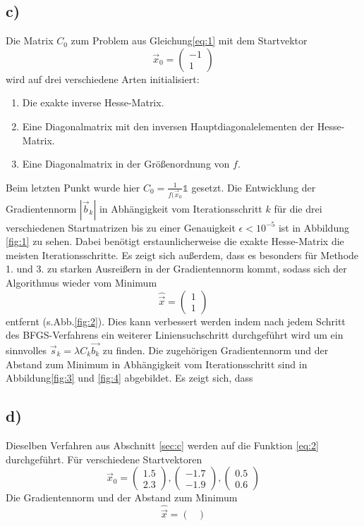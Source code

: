 \subsection*{c)}
\label{sec:c}
Die Matrix $C_0$ zum Problem aus Gleichung\eqref{eq:1} mit dem Startvektor
\[
\vec{x}_0 = \begin{pmatrix}
-1\\
1
\end{pmatrix}
\]
wird auf drei verschiedene Arten initialisiert:
\begin{enumerate}
\item Die exakte inverse Hesse-Matrix.
\item Eine Diagonalmatrix mit den inversen Hauptdiagonalelementen der Hesse-Matrix.
\item Eine Diagonalmatrix in der Größenordnung von $f$.
\end{enumerate}
Beim letzten Punkt wurde hier $C_0 = \frac{1}{f(\vec{x}_0}\mathds{1}$ gesetzt.
Die Entwicklung der Gradientennorm $|\vec{b}_k|$ in Abhängigkeit vom Iterationsschritt $k$ für die drei verschiedenen Startmatrizen bis zu einer Genauigkeit $\epsilon < 10^{-5}$ ist in Abbildung \ref{fig:1} zu sehen. Dabei benötigt erstaunlicherweise die exakte Hesse-Matrix die meisten Iterationsschritte. Es zeigt sich außerdem, dass es besonders für Methode 1. und 3. zu starken Ausreißern in der Gradientennorm kommt, sodass sich der Algorithmus wieder vom Minimum 
\[
\hat{\vec{x}} = \begin{pmatrix}
1 \\
1
\end{pmatrix}
\]
entfernt (s.Abb.\ref{fig:2}).
Dies kann verbessert werden indem nach jedem Schritt des BFGS-Verfahrens ein weiterer Liniensuchschritt durchgeführt wird um ein sinnvolles $\vec{s}_k = \lambda C_k \vec{b_{k}}$ zu finden.
Die zugehörigen Gradientennorm und der Abstand zum Minimum in Abhängigkeit vom Iterationsschritt sind in Abbildung\ref{fig:3} und \ref{fig:4} abgebildet.
Es zeigt sich, dass

\subsection*{d)}
Dieselben Verfahren aus Abschnitt \ref{sec:c} werden auf die Funktion \eqref{eq:2} durchgeführt.
Für verschiedene Startvektoren
\[
\vec{x}_0 = \begin{pmatrix}
1.5\\
2.3
\end{pmatrix},\begin{pmatrix}
-1.7\\
-1.9
\end{pmatrix},\begin{pmatrix}
0.5\\
0.6
\end{pmatrix}
\]
Die Gradientennorm und der Abstand zum Minimum
\[
\hat{\vec{x}}= \begin{pmatrix}

\end{pmatrix}
\]



